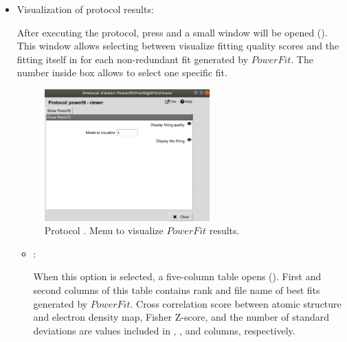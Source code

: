\begin{itemize}
  \item Visualization of protocol results:
  
  After executing the protocol, press  and a small window will be opened (). This window allows selecting between visualize fitting quality scores and the fitting itself in \chimera for each non-redundant fit generated by $PowerFit$. The number inside  box allows to select one specific fit.
  
  \begin{figure}[H]
    \centering 
    \captionsetup{width=.7\linewidth} 
    \includegraphics[width=0.60\textwidth]{Images_appendix/Fig114.pdf}
    \caption{Protocol . Menu to visualize $PowerFit$ results.}
    \label{fig:app_protocol_powerfit_2}
   \end{figure}
   
   \begin{itemize}
   
    \item {}:
    
    When this option is selected, a five-column table opens (). First and second columns of this table contains rank and file name of best fits generated by $PowerFit$. Cross correlation score between atomic structure and electron density map, Fisher Z-score, and the number of standard deviations are values included in , , and  columns, respectively.
   

\end{itemize}
\end{itemize}
